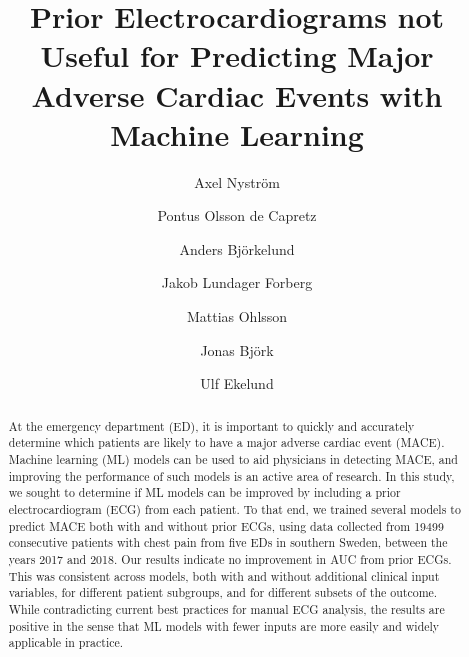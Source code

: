 \documentclass[preprint]{elsarticle}
\begin{document}
\begin{frontmatter}

\title{Prior Electrocardiograms not Useful for Predicting Major Adverse Cardiac Events with Machine Learning}


\author[inst1]{Axel Nystr\"{o}m}
\author[inst2,inst3]{Pontus Olsson de Capretz}
\author[inst4]{Anders Bj\"{o}rkelund}
\author[inst3,inst5]{Jakob Lundager Forberg}
\author[inst4,inst6]{Mattias Ohlsson}
\author[inst1,inst7]{Jonas Bj\"{o}rk}
\author[inst2,inst3]{Ulf Ekelund}


            







\begin{abstract}
At the emergency department (ED), it is important to quickly and accurately determine which patients are likely to have a major adverse cardiac event (MACE). Machine learning (ML) models can be used to aid physicians in detecting MACE, and improving the performance of such models is an active area of research. In this study, we sought to determine if ML models can be improved by including a prior electrocardiogram (ECG) from each patient. To that end, we trained several models to predict MACE both with and without prior ECGs, using data collected from 19499 consecutive patients with chest pain from five EDs in southern Sweden, between the years 2017 and 2018. Our results indicate no improvement in AUC from prior ECGs. This was consistent across models, both with and without additional clinical input variables, for different patient subgroups, and for different subsets of the outcome. While contradicting current best practices for manual ECG analysis, the results are positive in the sense that ML models with fewer inputs are more easily and widely applicable in practice.
\end{abstract}


\end{frontmatter}
\end{document}
